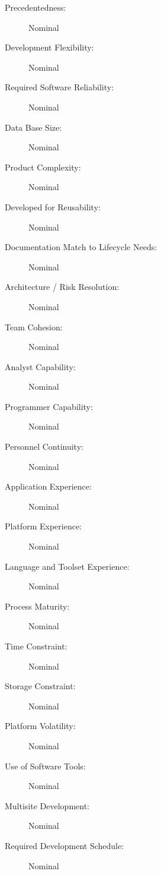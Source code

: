 \begin{description}
\item [Precedentedness:] Nominal
\item [Development Flexibility:] Nominal
\item [Required Software Reliability:] Nominal
\item [Data Base Size:] Nominal
\item [Product Complexity:] Nominal
\item [Developed for Reusability:] Nominal
\item [Documentation Match to Lifecycle Needs:] Nominal
\item [Architecture / Risk Resolution:] Nominal
\item [Team Cohesion:] Nominal
\item [Analyst Capability:] Nominal
\item [Programmer Capability:] Nominal
\item [Personnel Continuity:] Nominal
\item [Application Experience:] Nominal
\item [Platform Experience:] Nominal
\item [Language and Toolset Experience:] Nominal
\item [Process Maturity:] Nominal
\item [Time Constraint:] Nominal
\item [Storage Constraint:] Nominal
\item [Platform Volatility:] Nominal
\item [Use of Software Tools:] Nominal
\item [Multisite Development:] Nominal
\item [Required Development Schedule:] Nominal
\end{description}
